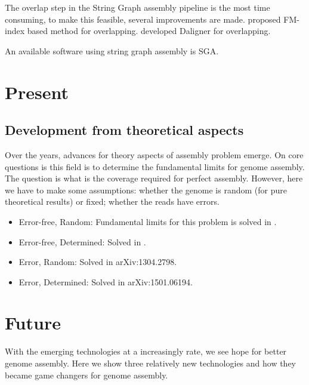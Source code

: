\documentclass{bioinfo}
\begin{document}
The overlap step in the String Graph assembly pipeline is the most time consuming, to make this feasible, several improvements are made. \cite{simpson2010efficient} proposed FM-index based method for overlapping. \cite{myers2014efficient} developed Daligner for overlapping. 


An available software using string graph assembly is SGA. 


\section{Present}
\subsection{Development from theoretical aspects}
Over the years, advances for theory aspects of assembly problem emerge. On core questions is this field is to determine the fundamental limits for genome assembly. The question is what is the coverage required for perfect assembly. However, here we have to make some assumptions: whether the genome is random (for pure theoretical results) or fixed; whether the reads have errors.

\begin{itemize}
	\item Error-free, Random: Fundamental limits for this problem is solved in \cite{motahari2013information}. 
	\item Error-free, Determined: Solved in \cite{bresler2012telescoper}.
	\item Error, Random: Solved in arXiv:1304.2798.
	\item Error, Determined: Solved in arXiv:1501.06194. 
\end{itemize}



\section{Future}
With the emerging technologies at a increasingly rate, we see hope for better genome assembly. Here we show three relatively new technologies and how they became game changers for genome assembly. 
\end{document}
